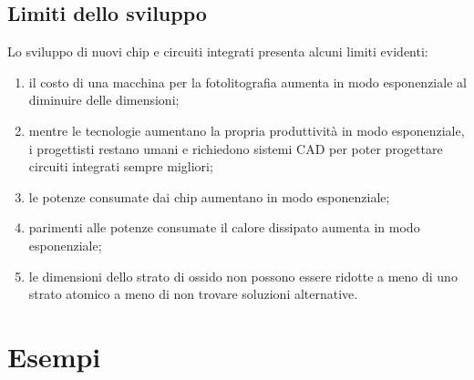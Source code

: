 \documentclass{article}
\numberwithin{equation}{subsection}
\begin{document}
	\subsection{Limiti dello sviluppo}
	Lo sviluppo di nuovi chip e circuiti integrati presenta alcuni limiti evidenti:
	\begin{enumerate}
		\item il costo di una macchina per la fotolitografia aumenta in modo esponenziale al diminuire delle dimensioni;
		\item mentre le tecnologie aumentano la propria produttività in modo esponenziale, i progettisti restano umani e richiedono sistemi CAD per poter progettare circuiti integrati sempre migliori;
		\item le potenze consumate dai chip aumentano in modo esponenziale;
		\item parimenti alle potenze consumate il calore dissipato aumenta in modo esponenziale;
		\item le dimensioni dello strato di ossido non possono essere ridotte a meno di uno strato atomico a meno di non trovare soluzioni alternative.
	\end{enumerate}
	
	\section{Esempi}
\end{document}
